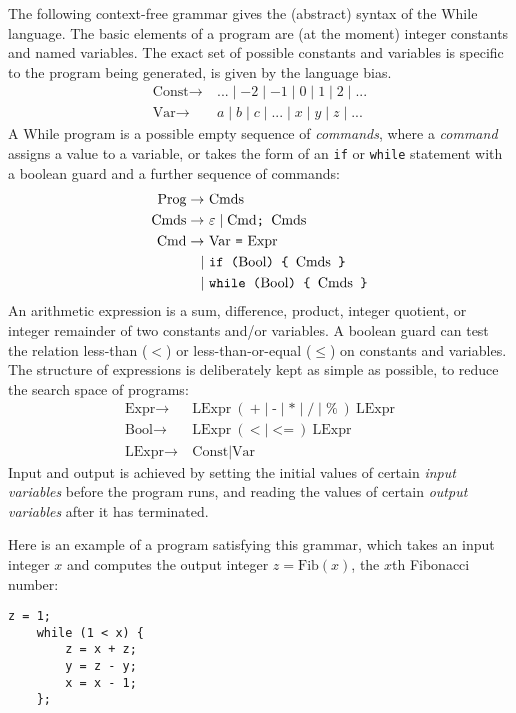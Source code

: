 \documentclass[a4paper,twoside,notitlepage]{article}
\newcommand{\ttt}{\texttt}
\newcommand{\trm}{\textrm}
\begin{document}
The following context-free grammar gives the (abstract) syntax of the While 
language. The basic elements of a program are (at the moment) integer 
constants and named variables. The exact set of possible constants and 
variables is specific to the program being generated, is given by the language 
bias.
\begin{align*}
   \trm{Const} \to\ & ... \mid -2 \mid -1 \mid 0 \mid 1 \mid 2 \mid ...
\\ \trm{Var}   \to\ & a \mid b \mid c \mid ... \mid x \mid y \mid z \mid ...
\end{align*}
A While program is a possible empty sequence of \emph{commands}, where a 
\emph{command} assigns a value to a variable, or takes the form of an \ttt{if} 
or \ttt{while} statement with a boolean guard and a further sequence of 
commands:
\begin{align*}
   \trm{Prog}  \to\ & \trm{Cmds}
\\ \trm{Cmds}  \to\ & \varepsilon \mid \trm{Cmd} \ttt{; } \trm{Cmds}
\\ \trm{Cmd}   \to\ & \trm{Var} \ \ttt{=} \ \trm{Expr}
\\            \mid\ & \ttt{if (} \trm{Bool} \ttt{) \char`\{\ } \trm{Cmds} \ttt{ \char`\}}
\\            \mid\ & \ttt{while (} \trm{Bool} \ttt{) \char`\{\ } \trm{Cmds} \ttt{ \char`\}}
\end{align*}
An arithmetic expression is a sum, difference, product, integer quotient, or 
integer remainder of two constants and/or variables. A boolean guard can test 
the relation less-than ($<$) or less-than-or-equal ($\leq$) on constants and 
variables. The structure of expressions is deliberately kept as simple as 
possible, to reduce the search space of programs:
\begin{align*}
   \trm{Expr}  \to\ & \trm{LExpr}\ (\ \ttt{+} \mid \ttt{-} \mid \ttt{*} \mid
                                      \ttt{/} \mid \ttt{\%} \ )\ \trm{LExpr}
\\ \trm{Bool}  \to\ & \trm{LExpr}\ (\ \ttt{<} \mid \ttt{<=}\ )\ \trm{LExpr}
\\ \trm{LExpr} \to\ & \trm{Const} \mid \trm{Var}
\end{align*}
Input and output is achieved by setting the initial values of certain 
\emph{input variables} before the program runs, and reading the values of 
certain \emph{output variables} after it has terminated.

Here is an example of a program satisfying this grammar, which takes an input 
integer $x$ and computes the output integer $z=\trm{Fib}(x)$, the $x$th 
Fibonacci number:
\begin{Verbatim}[samepage=true]
    z = 1;
    while (1 < x) {
        z = x + z;
        y = z - y;
        x = x - 1;
    };
\end{Verbatim}
\end{document}
